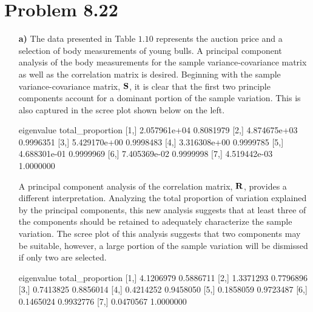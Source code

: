 \section*{Problem 8.22}
\begin{enumerate}
\item[\bf{a)}]
	The data presented in Table $1.10$ represents the auction price and a selection of body measurements of young bulls. A principal component analysis of the body measurements for the sample variance-covariance matrix as well as the correlation matrix is desired. Beginning with the sample variance-covariance matrix, $\mathrm{\bf{S}}$, it is clear that the first two principle components account for a dominant portion of the sample variation. This is also captured in the scree plot shown below on the left.

\begin{rc}

       eigenvalue total_proportion
[1,] 2.057961e+04        0.8081979
[2,] 4.874675e+03        0.9996351
[3,] 5.429170e+00        0.9998483
[4,] 3.316308e+00        0.9999785
[5,] 4.688301e-01        0.9999969
[6,] 7.405369e-02        0.9999998
[7,] 4.519442e-03        1.0000000
\end{rc}

	A principal component analysis of the correlation matrix, $\mathrm{\bf{R}}$, provides a different interpretation. Analyzing the total proportion of variation explained by the principal components, this new analysis suggests that at least three of the components should be retained to adequately characterize the sample variation. The scree plot of this analysis suggests that two components may be suitable, however, a large portion of the sample variation will be dismissed if only two are selected.

\begin{rc}

     eigenvalue total_proportion
[1,]  4.1206979        0.5886711
[2,]  1.3371293        0.7796896
[3,]  0.7413825        0.8856014
[4,]  0.4214252        0.9458050
[5,]  0.1858059        0.9723487
[6,]  0.1465024        0.9932776
[7,]  0.0470567        1.0000000
\end{rc}


\end{enumerate}
